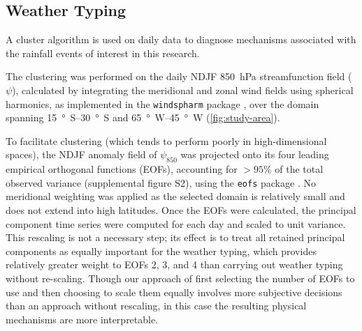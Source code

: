\documentclass{ametsoc}
\begin{document}
\subsection{Weather Typing} \label{sec:weather-typing}

A cluster algorithm is used on daily data to diagnose mechanisms associated with the rainfall events of interest in this research.

The clustering was performed on the daily NDJF \SI{850}{\hecto\pascal} streamfunction field ($\psi$), calculated by integrating the meridional and zonal wind fields using spherical harmonics, as implemented in the \texttt{windspharm} package \citep{Dawson:2016ws,Adams:1999fb}, over the domain spanning \SIrange{15}{30}{\degree S} and \SIrange{65}{45}{\degree W} (\cref{fig:study-area}).

To facilitate clustering (which tends to perform poorly in high-dimensional spaces), the NDJF anomaly field of $\psi_{850}$ was projected  onto its four leading empirical orthogonal functions (EOFs), accounting for $>95\%$ of the total observed variance (supplemental figure S2), using the \texttt{eofs} package \citep{Dawson:2016ge}.
No meridional weighting was applied as the selected domain is relatively small and does not extend into high latitudes.
Once the EOFs were calculated, the principal component time series were computed for each day and scaled to unit variance.
This rescaling is not a necessary step; its effect is to treat all retained principal components as equally important for the weather typing, which provides relatively greater weight to EOFs 2, 3, and 4 than carrying out weather typing without re-scaling.
Though our approach of first selecting the number of EOFs to use and then choosing to scale them equally involves more subjective decisions than an approach without rescaling, in this case the resulting physical mechanisms are more interpretable.
\end{document}
